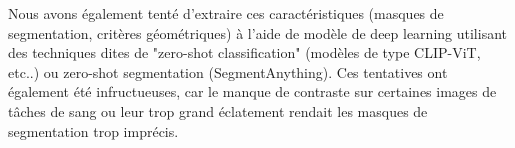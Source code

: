 Nous avons également tenté d'extraire ces caractéristiques (masques de segmentation, critères géométriques) à l'aide de modèle de deep learning
utilisant des techniques dites de "zero-shot classification" (modèles de type CLIP-ViT, etc..) ou zero-shot segmentation (SegmentAnything). Ces tentatives ont également été infructueuses, car le manque de contraste
sur certaines images de tâches de sang ou leur trop grand éclatement rendait les masques de segmentation trop imprécis.



